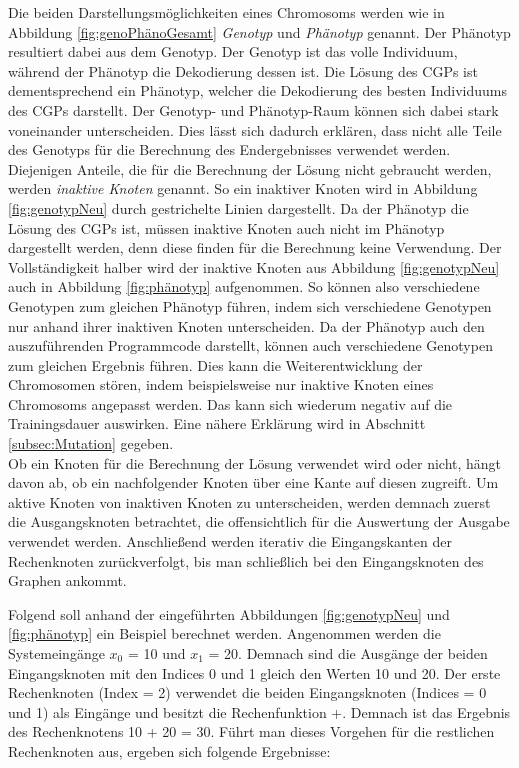 Die beiden Darstellungsmöglichkeiten eines Chromosoms werden wie in Abbildung \ref{fig:genoPhänoGesamt} \emph{Genotyp} und \emph{Phänotyp} genannt.
Der Phänotyp resultiert dabei aus dem Genotyp.
Der Genotyp ist das volle Individuum, während der Phänotyp die Dekodierung dessen ist.
Die Lösung des CGPs ist dementsprechend ein Phänotyp, welcher die Dekodierung des besten Individuums des CGPs darstellt.
Der Genotyp- und Phänotyp-Raum können sich dabei stark voneinander unterscheiden. \cite{eiben_introduction_2015}
Dies lässt sich dadurch erklären, dass nicht alle Teile des Genotyps für die Berechnung des Endergebnisses verwendet werden.
Diejenigen Anteile, die für die Berechnung der Lösung nicht gebraucht werden, werden \emph{inaktive Knoten} genannt.
So ein inaktiver Knoten wird in Abbildung \ref{fig:genotypNeu} durch gestrichelte Linien dargestellt.
Da der Phänotyp die Lösung des CGPs ist, müssen inaktive Knoten auch nicht im Phänotyp dargestellt werden, denn diese finden für die Berechnung keine Verwendung.
Der Vollständigkeit halber wird der inaktive Knoten aus Abbildung \ref{fig:genotypNeu} auch in Abbildung \ref{fig:phänotyp} aufgenommen.
So können also verschiedene Genotypen zum gleichen Phänotyp führen, indem sich verschiedene Genotypen nur anhand ihrer inaktiven Knoten unterscheiden.
Da der Phänotyp auch den auszuführenden Programmcode darstellt, können auch verschiedene Genotypen zum gleichen Ergebnis führen.
Dies kann die Weiterentwicklung der Chromosomen stören, indem beispielsweise nur inaktive Knoten eines Chromosoms angepasst werden.
Das kann sich wiederum negativ auf die Trainingsdauer auswirken.
Eine nähere Erklärung wird in Abschnitt \ref{subsec:Mutation} gegeben.\\
Ob ein Knoten für die Berechnung der Lösung verwendet wird oder nicht, hängt davon ab, ob ein nachfolgender Knoten über eine Kante auf diesen zugreift.
Um aktive Knoten von inaktiven Knoten zu unterscheiden, werden demnach zuerst die Ausgangsknoten betrachtet, die offensichtlich für die Auswertung der Ausgabe verwendet werden.
Anschließend werden iterativ die Eingangskanten der Rechenknoten zurückverfolgt, bis man schließlich bei den Eingangsknoten des Graphen ankommt.

Folgend soll anhand der eingeführten Abbildungen \ref{fig:genotypNeu} und \ref{fig:phänotyp} ein Beispiel berechnet werden.
Angenommen werden die Systemeingänge $x_0$ = 10 und $x_1$ = 20.
Demnach sind die Ausgänge der beiden Eingangsknoten mit den Indices 0 und 1 gleich den Werten 10 und 20.
Der erste Rechenknoten (Index = 2) verwendet die beiden Eingangsknoten (Indices = 0 und 1) als Eingänge und besitzt die Rechenfunktion +.
Demnach ist das Ergebnis des Rechenknotens 10 + 20 = 30.
Führt man dieses Vorgehen für die restlichen Rechenknoten aus, ergeben sich folgende Ergebnisse:

